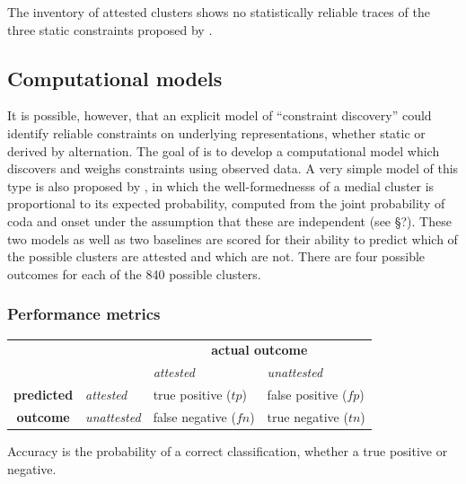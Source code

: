 The inventory of attested clusters shows no statistically reliable traces of the three static constraints proposed by \citet{Pierrehumbert1994}.

\subsection{Computational models}

It is possible, however, that an explicit model of ``constraint discovery'' could identify reliable constraints on underlying representations, whether static or derived by alternation. The goal of \citet{Hayes2008a} is to develop a computational model which discovers and weighs constraints using observed data. A very simple model of this type is also proposed by \citeauthor{Pierrehumbert1994}, in which the well-formednesss of a medial cluster is proportional to its expected probability, computed from the joint probability of coda and onset under the assumption that these are independent (see \S?). These two models as well as two baselines are scored for their ability to predict which of the possible clusters are attested and which are not. There are four possible outcomes for each of the 840 possible clusters.

\subsubsection{Performance metrics}

\begin{example}
\begin{tabular}{c l | l l}
                   & & \multicolumn{2}{c}{\textbf{actual outcome}}            \\
                   & & \emph{attested}   & \emph{unattested}            \\
\midrule
\textbf{predicted} & \emph{attested}   & true positive ($tp$)  & false positive ($fp$) \\
\textbf{outcome}   & \emph{unattested} & false negative ($fn$) & true negative ($tn$)  \\
\end{tabular}
\end{example}

\noindent Accuracy is the probability of a correct classification, whether a true positive or negative.

